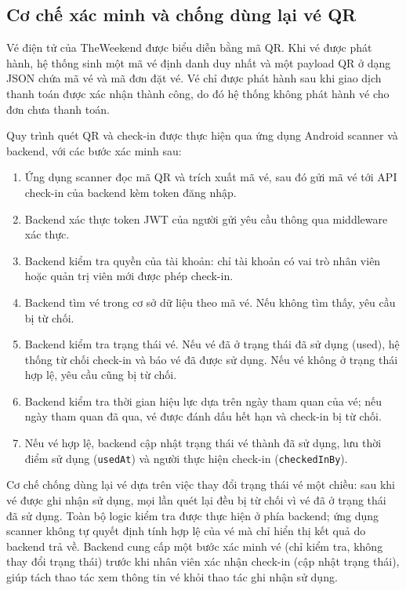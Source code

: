 ﻿\documentclass[../DoAn.tex]{subfiles}
\begin{document}
\subsection{Cơ chế xác minh và chống dùng lại vé QR}
\label{sec:checkin-mechanism}

Vé điện tử của TheWeekend được biểu diễn bằng mã QR. Khi vé được phát hành, hệ thống sinh một mã vé định danh duy nhất và một payload QR ở dạng JSON chứa mã vé và mã đơn đặt vé. Vé chỉ được phát hành sau khi giao dịch thanh toán được xác nhận thành công, do đó hệ thống không phát hành vé cho đơn chưa thanh toán.

Quy trình quét QR và check-in được thực hiện qua ứng dụng Android scanner và backend, với các bước xác minh sau:
\begin{enumerate}[leftmargin=1.6cm]
\item Ứng dụng scanner đọc mã QR và trích xuất mã vé, sau đó gửi mã vé tới API check-in của backend kèm token đăng nhập.
\item Backend xác thực token JWT của người gửi yêu cầu thông qua middleware xác thực.
\item Backend kiểm tra quyền của tài khoản: chỉ tài khoản có vai trò nhân viên hoặc quản trị viên mới được phép check-in.
\item Backend tìm vé trong cơ sở dữ liệu theo mã vé. Nếu không tìm thấy, yêu cầu bị từ chối.
\item Backend kiểm tra trạng thái vé. Nếu vé đã ở trạng thái đã sử dụng (used), hệ thống từ chối check-in và báo vé đã được sử dụng. Nếu vé không ở trạng thái hợp lệ, yêu cầu cũng bị từ chối.
\item Backend kiểm tra thời gian hiệu lực dựa trên ngày tham quan của vé; nếu ngày tham quan đã qua, vé được đánh dấu hết hạn và check-in bị từ chối.
\item Nếu vé hợp lệ, backend cập nhật trạng thái vé thành đã sử dụng, lưu thời điểm sử dụng (\texttt{usedAt}) và người thực hiện check-in (\texttt{checkedInBy}).
\end{enumerate}

Cơ chế chống dùng lại vé dựa trên việc thay đổi trạng thái vé một chiều: sau khi vé được ghi nhận sử dụng, mọi lần quét lại đều bị từ chối vì vé đã ở trạng thái đã sử dụng. Toàn bộ logic kiểm tra được thực hiện ở phía backend; ứng dụng scanner không tự quyết định tính hợp lệ của vé mà chỉ hiển thị kết quả do backend trả về. Backend cung cấp một bước xác minh vé (chỉ kiểm tra, không thay đổi trạng thái) trước khi nhân viên xác nhận check-in (cập nhật trạng thái), giúp tách thao tác xem thông tin vé khỏi thao tác ghi nhận sử dụng.
\end{document}
